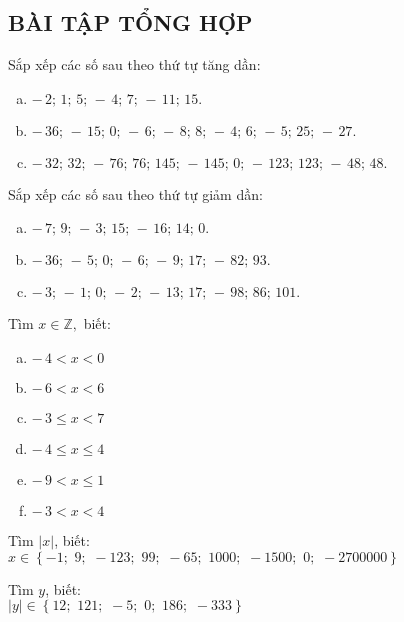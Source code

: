 \begin{bt}
\subsection{BÀI TẬP TỔNG HỢP}
\end{bt}   \begin{bt}
Sắp xếp các số sau theo thứ tự tăng dần:
\begin{enumerate}[a)]
\item $- \,2; \,1; \, 5; \,-\,4; \,7; \,-\,11; \,15.$
\item $-\,36;\, -\,15; \,0; \,-\,6; \,-\,8; \,8;\, -\,4; \,6;\, -\,5; \,25;\, -\,27.$
\item $-\,32; \,32;\, -\,76; \,76; \,145; \,-\,145;\, 0;\, -\,123;\, 123;\, -\,48;\, 48.$
\end{enumerate}
\end{bt}   \begin{bt}
Sắp xếp các số sau theo thứ tự giảm dần:
\begin{enumerate}[a)]
\item $-\,7;\, 9;\, -\,3; \,15;\, -\,16;\, 14;\, 0.$
\item $-\,36;\, -\,5;\, 0;\, -\,6;\, -\, 9;\, 17;\,-\,82;\, 93.$
\item $-\,3; \,-\,1;\, 0;\, -\,2;\, -\,13;\, 17;\, -\,98;\, 86;\, 101.$
\end{enumerate}
\end{bt}   \begin{bt}
Tìm $x \in \mathbb{Z},$ biết:
\begin{multicols}{2}
\begin{enumerate}[a)]
\item $- \, 4 < x < 0$
\item $-\,6 < x < 6$
\item $-\,3 \le x < 7$
\item $-\,4 \le x \le 4$
\item $-\,9 < x \le 1$
\item $-\,3 < x < 4$
\end{enumerate}
\end{multicols}
\end{bt}   \begin{bt}
Tìm $\left| x \right|$, biết:\\
$x \in \left\{ { - 1;\,\,9;\,\, - 123;\,\,99;\,\, - 65;\,\,1000;\,\, - 1500;\,\,0;\,\, - 2700000} \right\}$
\end{bt}   \begin{bt}
Tìm $y$, biết:\\
$\left| y \right| \in \left\{ {12;\,\,121;\,\, - 5;\,\,0;\,\,186;\,\, - 333} \right\}$

\end{bt}
